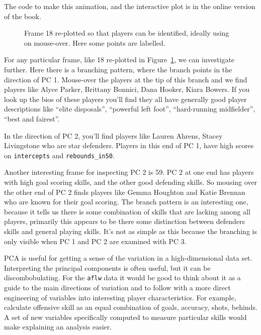 \documentclass[
  letterpaper,
]{krantz}
\begin{document}
The code to make this animation, and the interactive plot is in the
online version of the book.

\begin{figure}


\caption{\label{fig-aflw-pcaplots-pdf}Frame 18 re-plotted so that
players can be identified, ideally using on mouse-over. Here some points
are labelled.}

\end{figure}%

For any particular frame, like 18 re-plotted in
Figure~\ref{fig-aflw-pcaplots-pdf}, we can investigate further. Here
there is a branching pattern, where the branch points in the direction
of PC 1. Mouse-over the players at the tip of this branch and we find
players like Alyce Parker, Brittany Bonnici, Dana Hooker, Kiara Bowers.
If you look up the bios of these players you'll find they all have
generally good player descriptions like ``elite disposals'', ``powerful
left foot'', ``hard-running midfielder'', ``best and fairest''.

In the direction of PC 2, you'll find players like Lauren Ahrens, Stacey
Livingstone who are star defenders. Players in this end of PC 1, have
high scores on \texttt{intercepts} and \texttt{rebounds\_in50}.

Another interesting frame for inspecting PC 2 is 59. PC 2 at one end has
players with high goal scoring skills, and the other good defending
skills. So mousing over the other end of PC 2 finds players like Gemma
Houghton and Katie Brennan who are known for their goal scoring. The
branch pattern is an interesting one, because it tells us there is some
combination of skills that are lacking among all players, primarily this
appears to be there some distinction between defenders skills and
general playing skills. It's not as simple as this because the branching
is only visible when PC 1 and PC 2 are examined with PC 3.

PCA is useful for getting a sense of the variation in a high-dimensional
data set. Interpreting the principal components is often useful, but it
can be discombobulating. For the \texttt{aflw} data it would be good to
think about it as a guide to the main directions of variation and to
follow with a more direct engineering of variables into interesting
player characteristics. For example, calculate offensive skill as an
equal combination of goals, accuracy, shots, behinds. A set of new
variables specifically computed to measure particular skills would make
explaining an analysis easier.
\end{document}
